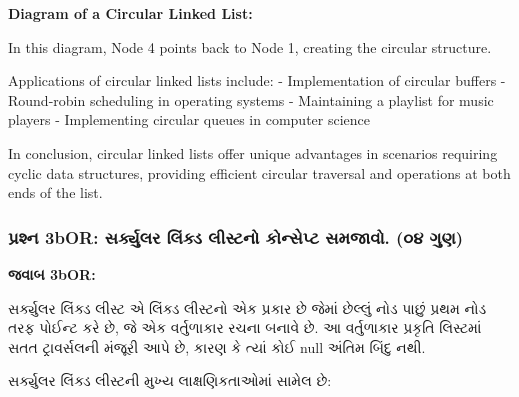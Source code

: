 \textbf{Diagram of a Circular Linked List:}

\begin{Shaded}
\begin{Highlighting}[]
\end{Highlighting}
\end{Shaded}

In this diagram, Node 4 points back to Node 1, creating the circular
structure.

Applications of circular linked lists include: - Implementation of
circular buffers - Round-robin scheduling in operating systems -
Maintaining a playlist for music players - Implementing circular queues
in computer science

In conclusion, circular linked lists offer unique advantages in
scenarios requiring cyclic data structures, providing efficient circular
traversal and operations at both ends of the list.

\hypertarget{uxaaauxab0uxab6uxaa8-3bor-uxab8uxab0uxa95uxaafuxab2uxab0-uxab2uxa95uxaa1-uxab2uxab8uxa9fuxaa8-uxa95uxaa8uxab8uxaaauxa9f-uxab8uxaaeuxa9cuxab5.-uxae6uxaea-uxa97uxaa3}{%
\subsubsection{પ્રશ્ન 3bOR: સર્ક્યુલર લિંક્ડ લીસ્ટનો કોન્સેપ્ટ સમજાવો. (૦૪
ગુણ)}\label{uxaaauxab0uxab6uxaa8-3bor-uxab8uxab0uxa95uxaafuxab2uxab0-uxab2uxa95uxaa1-uxab2uxab8uxa9fuxaa8-uxa95uxaa8uxab8uxaaauxa9f-uxab8uxaaeuxa9cuxab5.-uxae6uxaea-uxa97uxaa3}}

\textbf{જવાબ 3bOR:}

સર્ક્યુલર લિંક્ડ લીસ્ટ એ લિંક્ડ લીસ્ટનો એક પ્રકાર છે જેમાં છેલ્લું નોડ પાછું પ્રથમ નોડ તરફ
પોઈન્ટ કરે છે, જે એક વર્તુળાકાર રચના બનાવે છે. આ વર્તુળાકાર પ્રકૃતિ લિસ્ટમાં સતત
ટ્રાવર્સલની મંજૂરી આપે છે, કારણ કે ત્યાં કોઈ null અંતિમ બિંદુ નથી.

સર્ક્યુલર લિંક્ડ લીસ્ટની મુખ્ય લાક્ષણિકતાઓમાં સામેલ છે:

